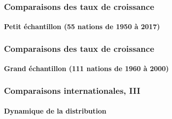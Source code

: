 \documentclass[10pt,notheorems]{beamer}
\theoremstyle{plain}
\theoremstyle{definition} %
\begin{document}
\begin{frame}
  \frametitle{Comparaisons des taux de croissance}
  \framesubtitle{Petit échantillon (55 nations de 1950 à 2017)}

  \begin{Center}
    
  \end{Center}

\end{frame}


\begin{frame}
  \frametitle{Comparaisons des taux de croissance}
  \framesubtitle{Grand échantillon (111 nations de 1960 à 2000)}

  \begin{Center}
    
  \end{Center}

\end{frame}


\begin{frame}
  \frametitle{Comparaisons internationales, III}
  \framesubtitle{Dynamique de la distribution}

  \begin{center}
    
  \end{center}

\end{frame}
\end{document}
